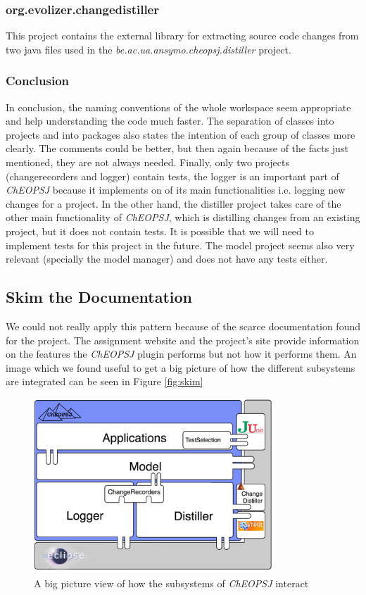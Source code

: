 \documentclass[a4paper]{article}
\begin{document}
\subsubsection{org.evolizer.changedistiller}
This project contains the external library for extracting source code changes from two java files used in the \emph{be.ac.ua.ansymo.cheopsj.distiller} project.

\subsubsection{Conclusion}
In conclusion, the naming conventions of the whole workspace seem appropriate and help understanding the code much faster. The separation of classes into projects and into packages also states the intention of each group of classes more clearly. The comments could be better, but then again because of the facts just mentioned, they are not always needed. Finally, only two projects (changerecorders and logger) contain tests, the logger is an important part of \emph{ChEOPSJ} because it implements on of its main functionalities i.e. logging new changes for a project. In the other hand, the distiller project takes care of the other main functionality of \emph{ChEOPSJ}, which is distilling changes from an existing project, but it does not contain tests. It is possible that we will need to implement tests for this project in the future. The model project seems also very relevant (specially the model manager) and does not have any tests either.

\subsection{Skim the Documentation}
We could not really apply this pattern because of the scarce documentation found for the project. The assignment website and the project's site provide information on the features the \emph{ChEOPSJ} plugin performs but not how it performs them. An image which we found useful to get a big picture of how the different subsystems are integrated can be seen in Figure \ref{fig:skim}

\begin{figure}[h]
\centering
\includegraphics[width=0.8\textwidth]{Images/skim}
\caption{A big picture view of how the subsystems of \emph{ChEOPSJ} interact}
\label{fig:spec0}
\end{figure}
\end{document}
